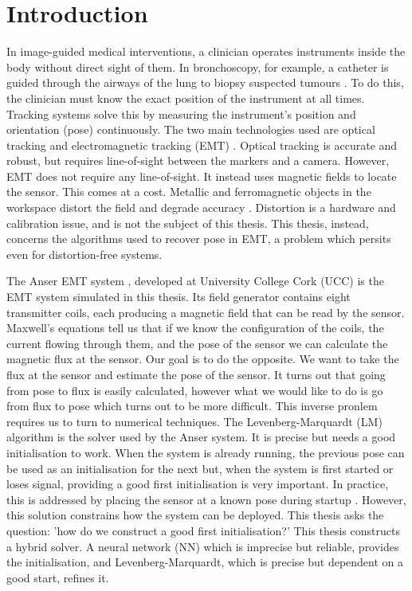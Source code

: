 \chapter{Introduction}


In image-guided medical interventions, a clinician operates instruments inside the body without direct sight of them. In bronchoscopy, for example, a catheter is guided through the airways of the lung to biopsy suspected tumours \cite{jaeger2018}. To do this, the clinician must know the exact position of the instrument at all times. Tracking systems solve this by measuring the instrument's position and orientation (pose) continuously. The two main technologies used are optical tracking and electromagnetic tracking (EMT) \cite{sorriento2020}. Optical tracking is accurate and robust, but requires line-of-sight between the markers and a camera. However, EMT does not require any line-of-sight. It instead uses magnetic fields to locate the sensor. This comes at a cost. Metallic and ferromagnetic objects in the workspace distort the field and degrade accuracy \cite{sorriento2020}. Distortion is a hardware and calibration issue, and is not the subject of this thesis. This thesis, instead, concerns the algorithms used to recover pose in EMT, a problem which persits even for distortion-free systems.


The Anser EMT system \cite{jaeger2017}, developed at University College Cork (UCC) is the EMT system simulated in this thesis. Its field generator contains eight transmitter coils, each producing a magnetic field that can be read by the sensor. Maxwell's equations tell us that if we know the configuration of the coils, the current flowing through them, and the pose of the sensor we can calculate the magnetic flux at the sensor. Our goal is to do the opposite. We want to take the flux at the sensor and estimate the pose of the sensor. It turns out that going from pose to flux is easily calculated, however what we would like to do is go from flux to pose which turns out to be more difficult. This inverse pronlem requires us to turn to numerical techniques. The Levenberg-Marquardt (LM) algorithm is the solver used by the Anser system. It is precise but needs a good initialisation to work. When the system is already running, the previous pose can be used as an initialisation for the next but, when the system is first started or loses signal, providing a good first initialisation is very important. In practice, this is addressed by placing the sensor at a known pose during startup \cite{jaeger2018}. However, this solution constrains how the system can be deployed. This thesis asks the question: 'how do we construct a good first initialisation?' 
This thesis constructs a hybrid solver. A neural network (NN) which is imprecise but reliable, provides the initialisation, and Levenberg-Marquardt, which is precise but dependent on a good start, refines it.

